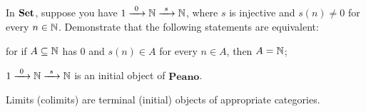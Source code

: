 \begin{exercise}
  In \(\mathbf{Set}\), suppose you have
  \(1 \xrightarrow{\ 0\ } \mathbb N \xrightarrow{\ s\ } \mathbb N\), where \(s\) is
  injective and \(s(n) \ne 0\) for every \(n \in \mathbb N\). Demonstrate
  that the following statements are equivalent:
  \begin{tcbenum}
  \item for if \(A \subseteq \mathbb N\) has \(0\) and \(s(n) \in A\) for every
    \(n \in A\), then \(A = \mathbb N\);
  \item \(1 \xrightarrow{\ 0\ } \mathbb N \xrightarrow{\ s\ } \mathbb N\) is an initial
    object of \(\mathbf{Peano}\).
  \end{tcbenum}
\end{exercise}

Limits (colimits) are terminal (initial) objects of appropriate
categories.

